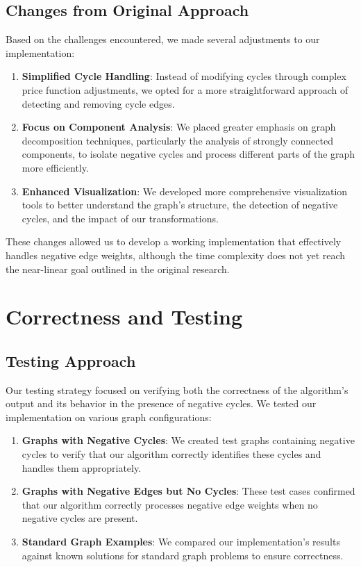 \documentclass[11pt]{article}
\begin{document}
\subsection{Changes from Original Approach}

Based on the challenges encountered, we made several adjustments to our implementation:

\begin{enumerate}
    \item \textbf{Simplified Cycle Handling}: Instead of modifying cycles through complex price function adjustments, we opted for a more straightforward approach of detecting and removing cycle edges.
    
    \item \textbf{Focus on Component Analysis}: We placed greater emphasis on graph decomposition techniques, particularly the analysis of strongly connected components, to isolate negative cycles and process different parts of the graph more efficiently.
    
    \item \textbf{Enhanced Visualization}: We developed more comprehensive visualization tools to better understand the graph's structure, the detection of negative cycles, and the impact of our transformations.
\end{enumerate}

These changes allowed us to develop a working implementation that effectively handles negative edge weights, although the time complexity does not yet reach the near-linear goal outlined in the original research.

\section{Correctness and Testing}

\subsection{Testing Approach}

Our testing strategy focused on verifying both the correctness of the algorithm's output and its behavior in the presence of negative cycles. We tested our implementation on various graph configurations:

\begin{enumerate}
    \item \textbf{Graphs with Negative Cycles}: We created test graphs containing negative cycles to verify that our algorithm correctly identifies these cycles and handles them appropriately.
    
    \item \textbf{Graphs with Negative Edges but No Cycles}: These test cases confirmed that our algorithm correctly processes negative edge weights when no negative cycles are present.
    
    \item \textbf{Standard Graph Examples}: We compared our implementation's results against known solutions for standard graph problems to ensure correctness.
\end{enumerate}
\end{document}
